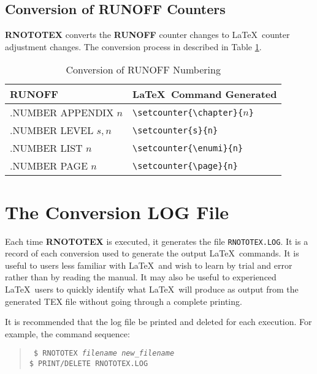 \subsection{Conversion of RUNOFF Counters}

{\bf RNOTOTEX} converts the {\bf RUNOFF} counter changes to \LaTeX\ counter
adjustment changes.  The conversion process in described in Table
\ref{counter-commands}.

\begin{table}[h]
\begin{center}
\begin{tabular}{ll}
{\large\bf RUNOFF}	& {\LaTeX\ \large\bf Command Generated} \\ \hline
.NUMBER APPENDIX $n$   & \verb+\setcounter{\chapter}{+$n$\verb+}+ \\
.NUMBER LEVEL    $s,n$ & \verb+\setcounter{s}{n}+ \\
.NUMBER LIST     $n$   & \verb+\setcounter{\enumi}{n}+ \\
.NUMBER PAGE     $n$   & \verb+\setcounter{\page}{n}+ \\ \hline
\end{tabular}
\caption{Conversion of RUNOFF Numbering\label{counter-commands}}
\end{center}
\end{table}

\section{The Conversion LOG File}

Each time {\bf RNOTOTEX} is executed, it generates the file {\tt RNOTOTEX.LOG}.
It is a record of each conversion used to generate the output \LaTeX\ commands.
It is useful to users less familiar with \LaTeX\ and wish to learn by trial and
error rather than by reading the manual.  It may also be useful to experienced
\LaTeX\ users to quickly identify what \LaTeX\ will produce as output from the
generated TEX file without going through a complete printing.

It is recommended that the log file be printed and deleted for each execution.
For example, the command sequence:

\begin{quote}\tt
\$ RNOTOTEX {\it filename} {\it new\_filename}\\
\$ PRINT/DELETE RNOTOTEX.LOG
\end{quote}


